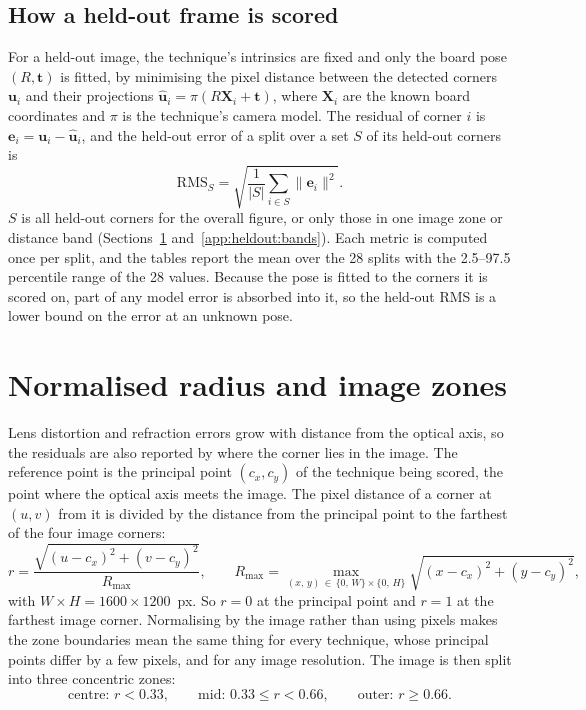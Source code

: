 \subsection{How a held-out frame is scored}
\label{subsec:appE.heldout_scoring}
For a held-out image, the technique's intrinsics are fixed and only the board pose $(R,\mathbf{t})$ is fitted, by
minimising the pixel distance between the detected corners $\mathbf{u}_i$ and their projections
$\hat{\mathbf{u}}_i = \pi(R\mathbf{X}_i + \mathbf{t})$, where $\mathbf{X}_i$ are the known board coordinates and
$\pi$ is the technique's camera model. The residual of corner $i$ is $\mathbf{e}_i = \mathbf{u}_i -
\hat{\mathbf{u}}_i$, and the held-out error of a split over a set $S$ of its held-out corners is
\begin{equation}
  \mathrm{RMS}_S = \sqrt{\frac{1}{|S|}\sum_{i\in S} \lVert \mathbf{e}_i \rVert^2 }.
\end{equation}
$S$ is all held-out corners for the overall figure, or only those in one image zone or distance band
(Sections~\ref{app:heldout:zones} and~\ref{app:heldout:bands}). Each metric is computed once per split, and the
tables report the mean over the 28 splits with the 2.5--97.5 percentile range of the 28 values. Because the pose
is fitted to the corners it is scored on, part of any model error is absorbed into it, so the held-out RMS is a
lower bound on the error at an unknown pose.

\section{Normalised radius and image zones}
\label{app:heldout:zones}

Lens distortion and refraction errors grow with distance from the optical axis, so the residuals are also
reported by where the corner lies in the image. The reference point is the principal point $(c_x, c_y)$ of the
technique being scored, the point where the optical axis meets the image. The pixel distance of a corner at
$(u, v)$ from it is divided by the distance from the principal point to the farthest of the four image corners:
\begin{equation}
  r = \frac{\sqrt{(u - c_x)^2 + (v - c_y)^2}}{R_{\max}}, \qquad
  R_{\max} = \max_{(x,\,y)\,\in\,\{0,\,W\}\times\{0,\,H\}} \sqrt{(x - c_x)^2 + (y - c_y)^2},
  \label{eq:app:radius}
\end{equation}
with $W \times H = 1600 \times 1200$~px. So $r = 0$ at the principal point and $r = 1$ at the farthest image
corner. Normalising by the image rather than using pixels makes the zone boundaries mean the same thing for every
technique, whose principal points differ by a few pixels, and for any image resolution. The image is then split
into three concentric zones:
\begin{equation}
  \text{centre: } r < 0.33, \qquad \text{mid: } 0.33 \le r < 0.66, \qquad \text{outer: } r \ge 0.66 .
\end{equation}

